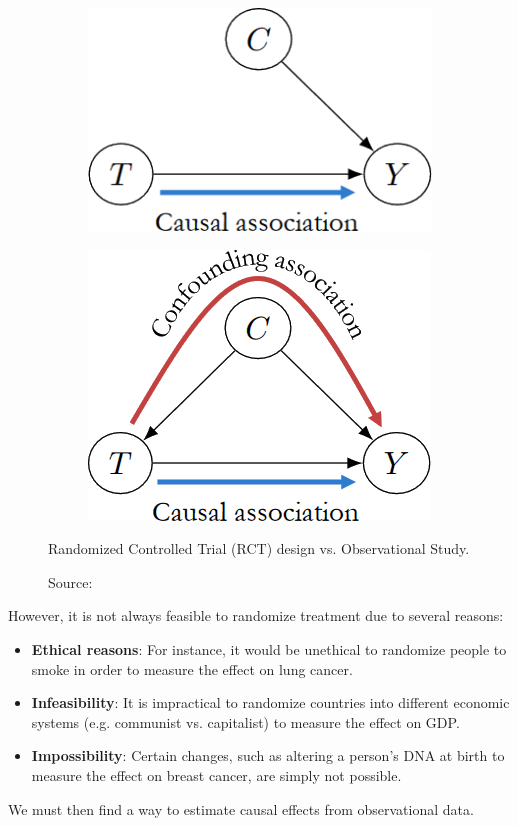 \begin{figure}[h]
    \centering
    \begin{subfigure}{.5\textwidth}
      \centering
      \includegraphics[width=.8\linewidth]{figures/ch3/13.rct1.png}
    \end{subfigure}%
    \begin{subfigure}{.5\textwidth}
      \centering
      \includegraphics[width=.8\linewidth]{figures/ch3/14.rct2.png}
    \end{subfigure}
    \caption{Randomized Controlled Trial (RCT) design vs. Observational Study.}
    \vspace{-10px}
    \caption*{\scriptsize{Source: \cite{Neal_2020a}}}
    \label{fig:rct}
\end{figure}

However, it is not always feasible to randomize treatment due to several reasons:
\begin{itemize}
    \item \textbf{Ethical reasons}: For instance, it would be unethical
    to randomize people to smoke in order to measure the effect on lung cancer.
    \item \textbf{Infeasibility}: It is impractical to randomize
    countries into different economic systems
    (e.g. communist vs. capitalist) to measure the effect on GDP.
    \item \textbf{Impossibility}: Certain changes, such as altering a
    person's DNA at birth to measure the effect on breast cancer,
    are simply not possible.
\end{itemize}
We must then find a way to estimate causal effects from observational data.

